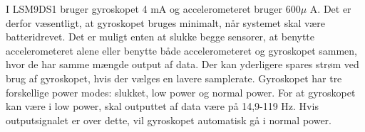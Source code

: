 I LSM9DS1 bruger gyroskopet 4 mA og accelerometeret bruger 600$\mu$ A. Det er derfor væsentligt, at gyroskopet bruges minimalt, når systemet skal være batteridrevet. Det er muligt enten at slukke begge sensorer, at benytte accelerometeret alene eller benytte både accelerometeret og gyroskopet sammen, hvor de har samme mængde output af data. Der kan yderligere spares strøm ved brug af gyroskopet, hvis der vælges en lavere samplerate. %
Gyroskopet har tre forskellige power modes: slukket, low power og normal power. For at gyroskopet kan være i low power, skal outputtet af data være på 14,9-119 Hz. Hvis outputsignalet er over dette, vil gyroskopet automatisk gå i normal power. 
